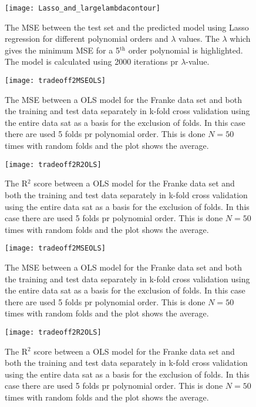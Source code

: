 \documentclass[uio,jmp,amsmath,amssymb,reprint,nofootinbib]{revtex4-1}
\numberwithin{equation}{section}
\begin{document}
\begin{figure}[H]
    \centering
    \texttt{[image: Lasso\_and\_largelambdacontour]}
    \caption{The MSE between the test set and the predicted model using Lasso regression for different polynomial orders and \(\lambda\) values. The \(\lambda\) which gives the minimum MSE for a 5\(^\text{th}\) order polynomial is highlighted. The model is calculated using 2000 iterations pr \(\lambda\)-value.}
    \label{fig:Vary_lambda_L4}
\end{figure}

\begin{figure}[H]
    \centering
    \texttt{[image: tradeoff2MSEOLS]}
    \caption{The MSE between a OLS model for the Franke data set and both the training and test data separately in k-fold cross validation using the entire data sat as a basis for the exclusion of folds. In this case there are used 5 folds pr polynomial order. This is done \(N=50\) times with random folds and the plot shows the average.}
    \label{fig:test_vs_trainRidge}
\end{figure}

\begin{figure}[H]
    \centering
    \texttt{[image: tradeoff2R2OLS]}
    \caption{The R\(^2\) score between a OLS model for the Franke data set and both the training and test data separately in k-fold cross validation using the entire data sat as a basis for the exclusion of folds. In this case there are used 5 folds pr polynomial order. This is done \(N=50\) times with random folds and the plot shows the average.}
    \label{fig:test_vs_trainR2Ridge}
\end{figure}

\begin{figure}[H]
    \centering
    \texttt{[image: tradeoff2MSEOLS]}
    \caption{The MSE between a OLS model for the Franke data set and both the training and test data separately in k-fold cross validation using the entire data sat as a basis for the exclusion of folds. In this case there are used 5 folds pr polynomial order. This is done \(N=50\) times with random folds and the plot shows the average.}
    \label{fig:test_vs_trainLasso}
\end{figure}

\begin{figure}[H]
    \centering
    \texttt{[image: tradeoff2R2OLS]}
    \caption{The R\(^2\) score between a OLS model for the Franke data set and both the training and test data separately in k-fold cross validation using the entire data sat as a basis for the exclusion of folds. In this case there are used 5 folds pr polynomial order. This is done \(N=50\) times with random folds and the plot shows the average.}
    \label{fig:test_vs_trainR2Lasso}
\end{figure}
\end{document}
